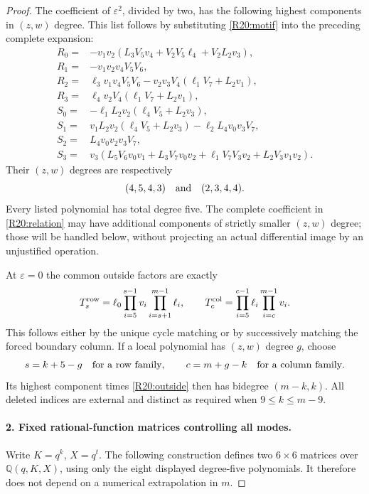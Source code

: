 \documentclass[11pt,a4paper]{article}
\theoremstyle{definition}\newtheorem{definition}{Definition}
\begin{document}
\begin{proof}
The coefficient of $\varepsilon^2$, divided by two, has the following
highest components in $(z,w)$ degree. This list follows by substituting
\eqref{R20:motif} into the preceding complete expansion:
\begin{align*}
 R_0={}&-v_1v_2(L_3V_5v_4+V_2V_5\ell_4+V_2L_2v_3),\\
 R_1={}&-v_1v_2v_4V_5V_6,\\
 R_2={}&\ell_3v_1v_4V_5V_6
          -v_2v_3V_4(\ell_1V_7+L_2v_1),\\
 R_3={}&\ell_4v_2V_4(\ell_1V_7+L_2v_1),\\[2pt]
 S_0={}&-\ell_1L_2v_2(\ell_4V_5+L_2v_3),\\
 S_1={}&v_1L_2v_2(\ell_4V_5+L_2v_3)
          -\ell_2L_4v_0v_3V_7,\\
 S_2={}&L_4v_0v_2v_3V_7,\\
 S_3={}&v_3(L_5V_6v_0v_1+L_3V_7v_0v_2
                +\ell_1V_7V_3v_2+L_2V_3v_1v_2).
\end{align*}
Their $(z,w)$ degrees are respectively
\begin{equation}\label{R20:grades}
 (4,5,4,3)\quad\hbox{and}\quad(2,3,4,4).
\end{equation}
Every listed polynomial has total degree five. The complete
coefficient in \eqref{R20:relation} may have additional components
of strictly smaller $(z,w)$ degree; those will be handled below,
without projecting an actual differential image by an unjustified
operation.

At $\varepsilon=0$ the common outside factors are exactly
\begin{equation}\label{R20:outside}
 T_s^{\rm row}=\ell_0\prod_{i=5}^{s-1}v_i
                         \prod_{i=s+1}^{m-1}\ell_i,
 \qquad
 T_c^{\rm col}=\prod_{i=5}^{c-1}\ell_i
                         \prod_{i=c}^{m-1}v_i.
\end{equation}
This follows either by the unique cycle matching or by successively
matching the forced boundary column. If a local polynomial has
$(z,w)$ degree $g$, choose
\begin{equation}\label{R20:alignment}
 s=k+5-g\quad\hbox{for a row family},\qquad
 c=m+g-k\quad\hbox{for a column family}.
\end{equation}
Its highest component times \eqref{R20:outside} then has bidegree
$(m-k,k)$. All deleted indices are external and distinct as required
when $9\leq k\leq m-9$.

\paragraph{2. Fixed rational-function matrices controlling all modes.}
Write $K=q^k$, $X=q^t$. The following construction defines two
$6\times6$ matrices over $\mathbb Q(q,K,X)$, using only the eight
displayed degree-five polynomials. It therefore does not depend on
a numerical extrapolation in $m$.


\end{proof}
\end{document}
